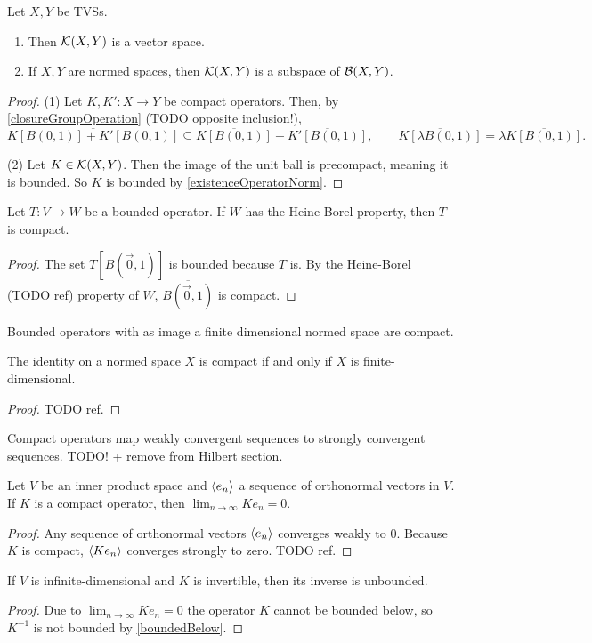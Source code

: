 \begin{lemma}
Let $X,Y$ be TVSs.
\begin{enumerate}
\item Then $\operatorname{\mathcal{K}}(X, Y)$ is a vector space.
\item If $X,Y$ are normed spaces, then $\operatorname{\mathcal{K}}(X, Y)$ is a subspace of $\operatorname{\mathcal{B}}(X, Y)$.
\end{enumerate}
\end{lemma}
\begin{proof}
(1) Let $K,K':X\to Y$ be compact operators. Then, by \ref{closureGroupOperation} (TODO opposite inclusion!),
\[ \overline{K[B(0, 1)]+K'[B(0, 1)]} \subseteq \overline{K[B(0, 1)]}+\overline{K'[B(0, 1)]}, \qquad \overline{K[\lambda B(0, 1)]} = \lambda\overline{K[B(0, 1)]}. \]

(2) Let $K\in\operatorname{\mathcal{K}}(X, Y)$. Then the image of the unit ball is precompact, meaning it is bounded. So $K$ is bounded by \ref{existenceOperatorNorm}.
\end{proof}

\begin{lemma}
Let $T:V\to W$ be a bounded operator. If $W$ has the Heine-Borel property, then $T$ is compact.
\end{lemma}
\begin{proof}
The set $T[B(\vec{0},1)]$ is bounded because $T$ is. By the Heine-Borel (TODO ref) property of $W$, $\overline{B(\vec{0},1)}$ is compact.
\end{proof}
\begin{corollary}
Bounded operators with as image a finite dimensional normed space are compact.
\end{corollary}
\begin{corollary}
The identity on a normed space $X$ is compact \textup{if and only if} $X$ is finite-dimensional.
\end{corollary}
\begin{proof}
TODO ref. 
\end{proof}

\begin{proposition}
Compact operators map weakly convergent sequences to strongly convergent sequences. TODO! + remove from Hilbert section.
\end{proposition}
\begin{corollary} \label{limitCompactImageOrthonormalSequence}
Let $V$ be an inner product space and $\left\langle e_n \right\rangle$ a sequence of orthonormal vectors in $V$. If $K$ is a compact operator, then $\lim_{n\to\infty}Ke_n = 0$.
\end{corollary}
\begin{proof}
Any sequence of orthonormal vectors $\left\langle e_n \right\rangle$ converges weakly to $0$. Because $K$ is compact, $\left\langle Ke_n \right\rangle$ converges strongly to zero. TODO ref.
\end{proof}
\begin{corollary}
If $V$ is infinite-dimensional and $K$ is invertible, then its inverse is unbounded.
\end{corollary}
\begin{proof}
Due to $\lim_{n\to\infty}Ke_n = 0$ the operator $K$ cannot be bounded below, so $K^{-1}$ is not bounded by \ref{boundedBelow}.
\end{proof}

